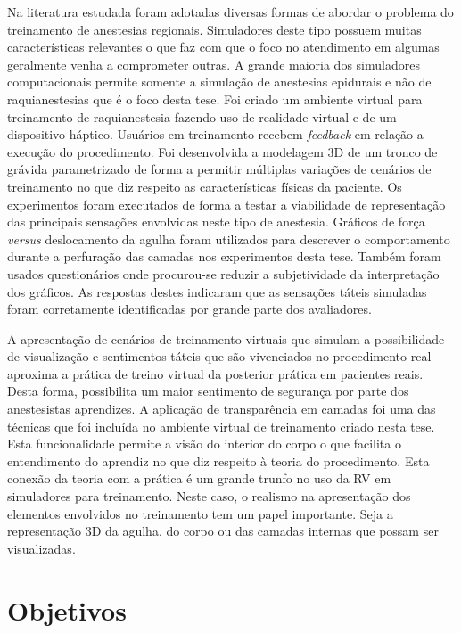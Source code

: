 Na literatura estudada foram adotadas diversas formas de abordar o problema do treinamento de anestesias regionais. Simuladores deste tipo possuem muitas características relevantes o que faz com que o foco no atendimento em algumas geralmente venha a comprometer outras. A grande maioria dos simuladores computacionais permite somente a simulação de anestesias epidurais e não de raquianestesias que é o foco desta tese. Foi criado um ambiente virtual para treinamento de raquianestesia fazendo uso de realidade virtual e de um dispositivo háptico. Usuários em treinamento recebem \textit{feedback} em relação a execução do procedimento. Foi desenvolvida a modelagem 3D de um tronco de grávida parametrizado de forma a permitir múltiplas variações de cenários de treinamento no que diz respeito as características físicas da paciente. Os experimentos foram executados de forma a testar a viabilidade de representação das principais sensações envolvidas neste tipo de anestesia. Gráficos de força \textit{versus} deslocamento da agulha foram utilizados para descrever o comportamento durante a perfuração das camadas nos experimentos desta tese. Também foram usados questionários onde procurou-se reduzir a subjetividade da interpretação dos gráficos. As respostas destes indicaram que as sensações táteis simuladas foram corretamente identificadas por grande parte dos avaliadores. 

A apresentação de cenários de treinamento virtuais que simulam a possibilidade de visualização e sentimentos táteis que são vivenciados no procedimento real aproxima a prática de treino virtual da posterior prática em pacientes reais. Desta forma, possibilita um maior sentimento de segurança por parte dos anestesistas aprendizes. A aplicação de transparência em camadas foi uma das técnicas que foi incluída no ambiente virtual de treinamento criado nesta tese. Esta funcionalidade permite a visão do interior do corpo o que facilita o entendimento do aprendiz no que diz respeito à teoria do procedimento. Esta conexão da teoria com a prática é um grande trunfo no uso da \acrfull{RV} em simuladores para treinamento. Neste caso, o realismo na apresentação dos elementos envolvidos no treinamento tem um papel importante. Seja a representação 3D da agulha, do corpo ou das camadas internas que possam ser visualizadas. 

\section{Objetivos}
\label{sec:objetivos}

